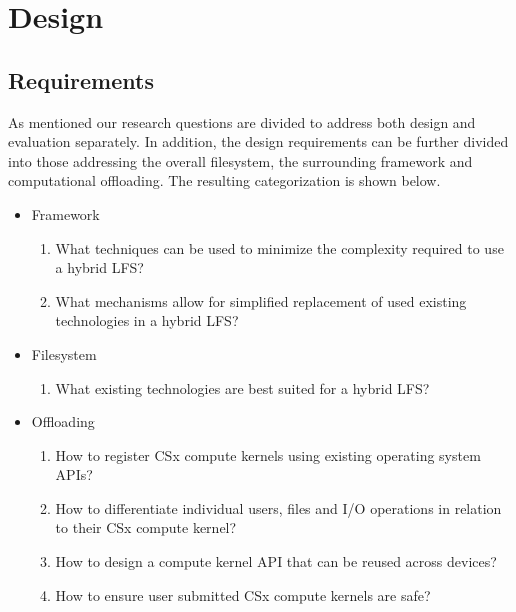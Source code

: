 
\chapter{Design} %

\section{Requirements}

As mentioned our research questions are divided to address both design and
evaluation separately. In addition, the design requirements can be further
divided into those addressing the overall filesystem, the surrounding
framework and computational offloading. The resulting categorization is shown
below.

\begin{itemize}
    \item Framework
    \begin{enumerate}
        \item What techniques can be used to minimize the complexity required to
            use a hybrid LFS?
        \item What mechanisms allow for simplified replacement of used existing
            technologies in a hybrid LFS?
    \end{enumerate}
    \item Filesystem
    \begin{enumerate}
        \item What existing technologies are best suited for a hybrid LFS?
    \end{enumerate}
    \item Offloading
    \begin{enumerate}
        \item How to register CSx compute kernels using existing operating
            system APIs?
        \item How to differentiate individual users, files and I/O operations in
            relation to their CSx compute kernel?
        \item How to design a compute kernel API that can be reused across devices?
        \item How to ensure user submitted CSx compute kernels are safe?
    \end{enumerate}
\end{itemize}

